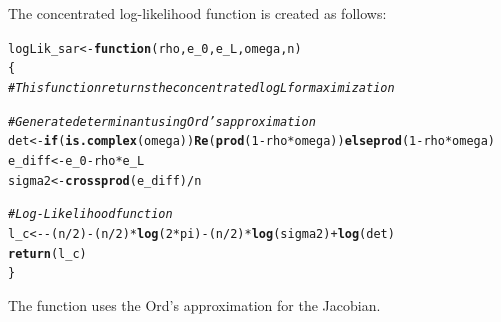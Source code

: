 \documentclass[english,12pt]{book}\usepackage[]{graphicx}\usepackage[]{xcolor}
\makeatletter
\newcommand{\hlnum}[1]{\textcolor[rgb]{0.686,0.059,0.569}{#1}}%
\newcommand{\hlcom}[1]{\textcolor[rgb]{0.678,0.584,0.686}{\textit{#1}}}%
\newcommand{\hlopt}[1]{\textcolor[rgb]{0,0,0}{#1}}%
\newcommand{\hlstd}[1]{\textcolor[rgb]{0.345,0.345,0.345}{#1}}%
\newcommand{\hlkwa}[1]{\textcolor[rgb]{0.161,0.373,0.58}{\textbf{#1}}}%
\newcommand{\hlkwb}[1]{\textcolor[rgb]{0.69,0.353,0.396}{#1}}%
\newcommand{\hlkwc}[1]{\textcolor[rgb]{0.333,0.667,0.333}{#1}}%
\newcommand{\hlkwd}[1]{\textcolor[rgb]{0.737,0.353,0.396}{\textbf{#1}}}%
\newenvironment{kframe}{%
 \def\at@end@of@kframe{}%
 \ifinner\ifhmode%
  \def\at@end@of@kframe{\end{minipage}}%
  \begin{minipage}{\columnwidth}%
 \fi\fi%
 \def\FrameCommand##1{\hskip\@totalleftmargin \hskip-\fboxsep
 \colorbox{shadecolor}{##1}\hskip-\fboxsep
     \hskip-\linewidth \hskip-\@totalleftmargin \hskip\columnwidth}%
 \MakeFramed {\advance\hsize-\width
   \@totalleftmargin\z@ \linewidth\hsize
   \@setminipage}}%
 {\par\unskip\endMakeFramed%
 \at@end@of@kframe}
\newenvironment{knitrout}{}{} %
\makeatother
\begin{document}
The concentrated log-likelihood function is created as follows:
\begin{knitrout}
\color{fgcolor}\begin{kframe}
\begin{alltt}
\hlstd{logLik_sar} \hlkwb{<-} \hlkwa{function}\hlstd{(}\hlkwc{rho}\hlstd{,} \hlkwc{e_0}\hlstd{,} \hlkwc{e_L}\hlstd{,} \hlkwc{omega}\hlstd{,} \hlkwc{n}\hlstd{)}
\hlstd{\{}
  \hlcom{# This function returns the concentrated log L for maximization}

  \hlcom{#Generate determinant using Ord's approximation}
  \hlstd{det}    \hlkwb{<-} \hlkwa{if} \hlstd{(}\hlkwd{is.complex}\hlstd{(omega))} \hlkwd{Re}\hlstd{(}\hlkwd{prod}\hlstd{(}\hlnum{1} \hlopt{-} \hlstd{rho} \hlopt{*} \hlstd{omega))} \hlkwa{else} \hlkwd{prod}\hlstd{(}\hlnum{1} \hlopt{-} \hlstd{rho} \hlopt{*} \hlstd{omega)}
  \hlstd{e_diff} \hlkwb{<-} \hlstd{e_0} \hlopt{-} \hlstd{rho} \hlopt{*} \hlstd{e_L}
  \hlstd{sigma2} \hlkwb{<-} \hlkwd{crossprod}\hlstd{(e_diff)} \hlopt{/} \hlstd{n}

  \hlcom{#Log-Likelihood function}
  \hlstd{l_c}    \hlkwb{<-} \hlopt{-} \hlstd{(n} \hlopt{/} \hlnum{2}\hlstd{)} \hlopt{-} \hlstd{(n} \hlopt{/} \hlnum{2}\hlstd{)} \hlopt{*} \hlkwd{log}\hlstd{(}\hlnum{2} \hlopt{*} \hlstd{pi)} \hlopt{-} \hlstd{(n} \hlopt{/} \hlnum{2}\hlstd{)} \hlopt{*} \hlkwd{log}\hlstd{(sigma2)} \hlopt{+} \hlkwd{log}\hlstd{(det)}
  \hlkwd{return}\hlstd{(l_c)}
\hlstd{\}}
\end{alltt}
\end{kframe}
\end{knitrout}

The  function uses the Ord's approximation for the Jacobian. 
\end{document}

